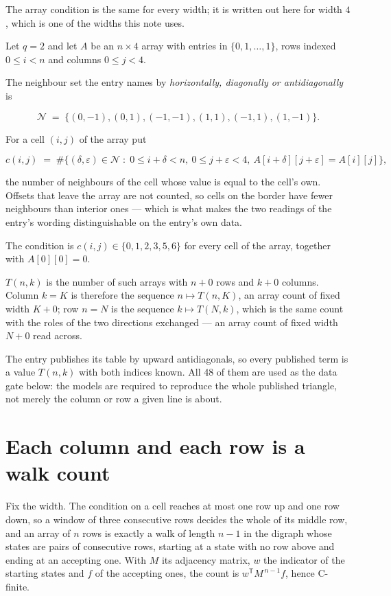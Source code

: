 \documentclass[11pt]{article}
\theoremstyle{definition}
\begin{document}
The array condition is the same for every width; it is written out here for width $4$, which is one of the widths this note uses.

Let $q = 2$ and let $A$ be an $n \times 4$ array with entries in $\{0,1,\dots,1\}$, rows indexed $0 \le i < n$ and columns $0 \le j < 4$.

The neighbour set the entry names by {\itshape horizontally, diagonally or antidiagonally} is

\[\mathcal{N} \;=\; \{(0,-1), (0,1), (-1,-1), (1,1), (-1,1), (1,-1)\}.\]

For a cell $(i,j)$ of the array put

\[c(i,j) \;=\; \#\bigl\{(\delta,\varepsilon)\in\mathcal{N} \;:\; 0\le i+\delta<n,\ 0\le j+\varepsilon<4,\ A[i+\delta][j+\varepsilon] = A[i][j]\bigr\},\]

the number of neighbours of the cell whose value is equal to the cell's own. Offsets that leave the array are not counted, so cells on the border have fewer neighbours than interior ones --- which is what makes the two readings of the entry's wording distinguishable on the entry's own data.

The condition is $c(i,j) \in \{0, 1, 2, 3, 5, 6\}$ for every cell of the array, together with $A[0][0]=0$.

$T(n,k)$ is the number of such arrays with $n + 0$ rows and $k + 0$ columns. Column $k = K$ is therefore the sequence $n \mapsto T(n,K)$, an array count of fixed width $K + 0$; row $n = N$ is the sequence $k \mapsto T(N,k)$, which is the same count with the roles of the two directions exchanged --- an array count of fixed width $N + 0$ read across.

The entry publishes its table by upward antidiagonals, so every published term is a value $T(n,k)$ with both indices known. All 48 of them are used as the data gate below: the models are required to reproduce the whole published triangle, not merely the column or row a given line is about.

\section{Each column and each row is a walk count}

Fix the width. The condition on a cell reaches at most one row up and one row down, so a window of three consecutive rows decides the whole of its middle row, and an array of $n$ rows is exactly a walk of length $n-1$ in the digraph whose states are pairs of consecutive rows, starting at a state with no row above and ending at an accepting one. With $M$ its adjacency matrix, $w$ the indicator of the starting states and $f$ of the accepting ones, the count is $w^{\mathsf T}M^{\,n-1}f$, hence C-finite.
\end{document}
